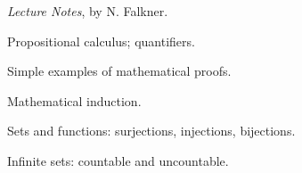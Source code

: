 \documentclass{osucourse}
\begin{document}
\CatalogDescription
\PrerequisitesAndExclusions

\begin{Text}
\emph{Lecture Notes}, by N. Falkner.
\end{Text}

\begin{TopicsList}
\item Propositional calculus; quantifiers.
\item Simple examples of mathematical proofs.
\item Mathematical induction.
\item Sets and functions: surjections, injections, bijections.
\item Infinite sets: countable and uncountable.
\end{TopicsList}
\end{document}
